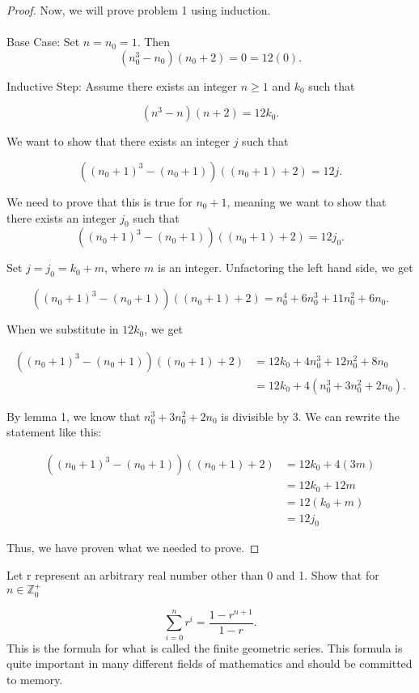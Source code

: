 \documentclass[12pt]{article}
\newenvironment{problem}[2][Problem]{\begin{trivlist}
\item[\hskip \labelsep {\bfseries #1}\hskip \labelsep {\bfseries #2.}]}{\end{trivlist}}
\begin{document}
\begin{proof} Now, we will prove problem 1 using induction. \\ \\
    Base Case: Set $n = n_0 = 1$. Then
    $$(n_0^3 - n_0)(n_0 + 2) = 0 = 12(0).$$

    \noindent Inductive Step: Assume there exists an integer $n \geq 1$ and $k_0$ such that

    $$(n^3 - n)(n + 2) = 12k_0.$$

    We want to show that there exists an integer $j$ such that

    $$((n_0+1)^3 - (n_0+1))((n_0+1) + 2) = 12j.$$
    
    We need to prove that this is true for $n_0 + 1$, meaning we want to show that there exists an integer $j_0$ such that
    $$((n_0+1)^3 - (n_0+1))((n_0+1) + 2) = 12j_0.$$

    Set $j = j_0 = k_0 + m$, where $m$ is an integer. Unfactoring the left hand side, we get 

    $$((n_0+1)^3 - (n_0+1))((n_0+1) + 2) = n_0^4 + 6n_0^3 + 11n_0^2 + 6n_0.$$

    When we substitute in $12k_0$, we get

    \begin{align*}
        ((n_0+1)^3 - (n_0+1))((n_0+1) + 2) & = 12k_0 + 4n_0^3 + 12n_0^2 + 8n_0 \\
        & = 12k_0 + 4(n_0^3 + 3n_0^2 + 2n_0).
    \end{align*}

    By lemma 1, we know that $n_0^3 + 3n_0^2 + 2n_0$ is divisible by 3. We can rewrite the statement like this:

    \begin{align*}
        ((n_0+1)^3 - (n_0+1))((n_0+1) + 2) & = 12k_0 + 4(3m) \\
        & = 12k_0 + 12m \\
        & = 12(k_0 + m) \\
        & = 12j_0
    \end{align*}

    Thus, we have proven what we needed to prove.


\end{proof}





\newpage
\begin{problem}{2}
    Let r represent an arbitrary real number other than 0 and 1. Show that for $n \in \mathbb{Z}_0^+$

    $$\sum_{i=0}^{n} r^i = \frac{1 - r^{n+1}}{1 - r}.$$
    This is the formula for what is called the finite geometric series. This formula is quite important in many different fields of mathematics and should be committed to memory.

\end{problem}
\end{document}
